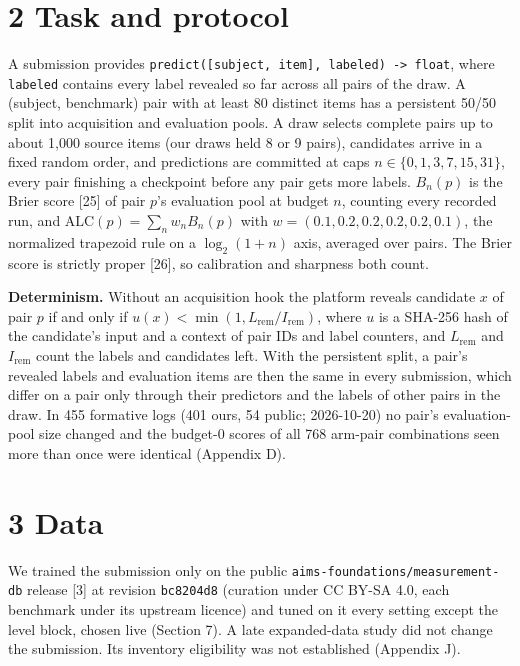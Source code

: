 \documentclass[
]{article}
\begin{document}
\section{2 Task and protocol}\label{task-and-protocol}

A submission provides
\texttt{predict({[}subject,\ item{]},\ labeled)\ -\textgreater{}\ float},
where \texttt{labeled} contains every label revealed so far across all
pairs of the draw. A (subject, benchmark) pair with at least 80 distinct
items has a persistent 50/50 split into acquisition and evaluation
pools. A draw selects complete pairs up to about 1,000 source items (our
draws held 8 or 9 pairs), candidates arrive in a fixed random order, and
predictions are committed at caps \(n \in \{0,1,3,7,15,31\}\), every
pair finishing a checkpoint before any pair gets more labels. \(B_n(p)\)
is the Brier score {[}25{]} of pair \(p\)'s evaluation pool at budget
\(n\), counting every recorded run, and
\(\mathrm{ALC}(p) = \sum_n w_n B_n(p)\) with \(w = (0.1,
0.2, 0.2, 0.2, 0.2, 0.1)\), the normalized trapezoid rule on a
\(\log_2(1+n)\) axis, averaged over pairs. The Brier score is strictly
proper {[}26{]}, so calibration and sharpness both count.

\textbf{Determinism.} Without an acquisition hook the platform reveals
candidate \(x\) of pair \(p\) if and only if \(u(x) <
\min(1, L_{\mathrm{rem}} / I_{\mathrm{rem}})\), where \(u\) is a SHA-256
hash of the candidate's input and a context of pair IDs and label
counters, and \(L_{\mathrm{rem}}\) and \(I_{\mathrm{rem}}\) count the
labels and candidates left. With the persistent split, a pair's revealed
labels and evaluation items are then the same in every submission, which
differ on a pair only through their predictors and the labels of other
pairs in the draw. In 455 formative logs (401 ours, 54 public;
2026-10-20) no pair's evaluation-pool size changed and the budget-0
scores of all 768 arm-pair combinations seen more than once were
identical (Appendix D).

\section{3 Data}\label{data}

We trained the submission only on the public
\texttt{aims-foundations/measurement-db} release {[}3{]} at revision
\texttt{bc8204d8} (curation under CC BY-SA 4.0, each benchmark under its
upstream licence) and tuned on it every setting except the level block,
chosen live (Section 7). A late expanded-data study did not change the
submission. Its inventory eligibility was not established (Appendix J).
\end{document}
